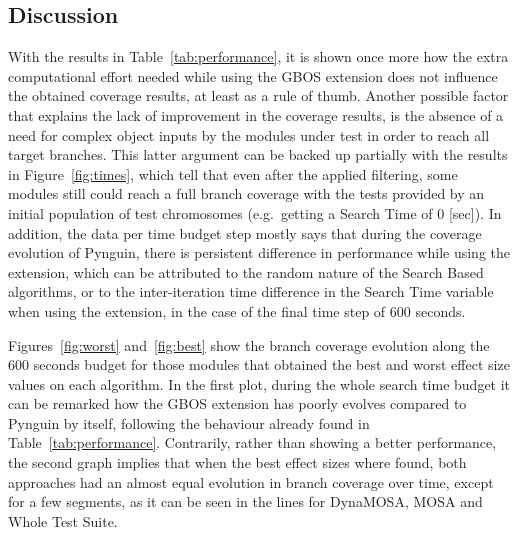 \documentclass[%
  chapterprefix=false,%
  open=right,%
  twoside=true,%
  paper=a4,%
  logofile={Figures/logo.png},%
  thesistype=master,%
  UKenglish,%
]{se2thesis}
\begin{document}
\newpage

\subsection*{Discussion}

With the results in Table~\ref{tab:performance}, it is shown once more how the extra computational effort needed while using the GBOS extension does not influence the obtained coverage results, at least as a rule of thumb.
Another possible factor that explains the lack of improvement in the coverage results, is the absence of a need for complex object inputs by the modules under test in order to reach all target branches.
This latter argument can be backed up partially with the results in Figure~\ref{fig:times}, which tell that even after the applied filtering, some modules still could reach a full branch coverage with the tests provided by an initial population of test chromosomes (e.g.~getting a Search Time of 0 [sec]).
In addition, the data per time budget step mostly says that during the coverage evolution of Pynguin, there is persistent difference in performance while using the extension, which can be attributed to the random nature of the Search Based algorithms, or to the inter-iteration time difference in the Search Time variable when using the extension, in the case of the final time step of 600 seconds.

Figures~\ref{fig:worst} and~\ref{fig:best} show the branch coverage evolution along the 600 seconds budget for those modules that obtained the best and worst effect size values on each algorithm.
In the first plot, during the whole search time budget it can be remarked how the GBOS extension has poorly evolves compared to Pynguin by itself, following the behaviour already found in Table~\ref{tab:performance}.
Contrarily, rather than showing a better performance, the second graph implies that when the best effect sizes where found, both approaches had an almost equal evolution in branch coverage over time, except for a few segments, as it can be seen in the lines for DynaMOSA, MOSA and Whole Test Suite.
\end{document}
